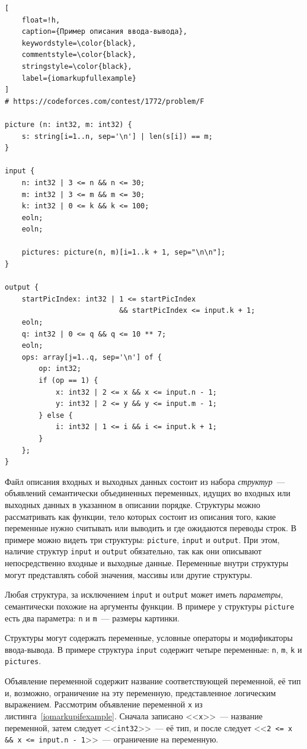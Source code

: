 \documentclass[times,specification,annotation]{style/itmo-student-thesis/itmo-student-thesis}
\begin{document}
\begin{lstlisting}[
    float=!h,
    caption={Пример описания ввода-вывода},
    keywordstyle=\color{black},
    commentstyle=\color{black},
    stringstyle=\color{black},
    label={iomarkupfullexample}
]
# https://codeforces.com/contest/1772/problem/F

picture (n: int32, m: int32) {
    s: string[i=1..n, sep='\n'] | len(s[i]) == m;
}

input {
    n: int32 | 3 <= n && n <= 30;
    m: int32 | 3 <= m && m <= 30;
    k: int32 | 0 <= k && k <= 100;
    eoln;
    eoln;

    pictures: picture(n, m)[i=1..k + 1, sep="\n\n"];
}

output {
    startPicIndex: int32 | 1 <= startPicIndex
                           && startPicIndex <= input.k + 1;
    eoln;
    q: int32 | 0 <= q && q <= 10 ** 7;
    eoln;
    ops: array[j=1..q, sep='\n'] of {
        op: int32;
        if (op == 1) {
            x: int32 | 2 <= x && x <= input.n - 1;
            y: int32 | 2 <= y && y <= input.m - 1;
        } else {
            i: int32 | 1 <= i && i <= input.k + 1;
        }
    };
}

\end{lstlisting}

Файл описания входных и выходных данных состоит из набора \textit{структур}~--- объявлений семантически объединенных переменных, идущих во входных или выходных данных в указанном в описании порядке. Структуры можно рассматривать как функции, тело которых состоит из описания того, какие переменные нужно считывать или выводить и где ожидаются переводы строк. В примере можно видеть три структуры: \texttt{picture}, \texttt{input} и \texttt{output}. При этом, наличие структур \texttt{input} и \texttt{output} обязательно, так как они описывают непосредственно входные и выходные данные. Переменные внутри структуры могут представлять собой значения, массивы или другие структуры.

Любая структура, за исключением \texttt{input} и \texttt{output} может иметь \textit{параметры}, семантически похожие на аргументы функции. В примере у структуры \texttt{picture} есть два параметра: \texttt{n} и \texttt{m}~--- размеры картинки.

Структуры могут содержать переменные, условные операторы и модификаторы ввода-вывода. В примере структура \texttt{input} содержит четыре переменные: \texttt{n}, \texttt{m}, \texttt{k} и \texttt{pictures}.

Объявление переменной содержит название соответствующей переменной, её тип и, возможно, ограничение на эту переменную, представленное логическим выражением. Рассмотрим объявление переменной \texttt{x} из листинга~\ref{iomarkupifexample}. Сначала записано <<\texttt{x}>>~--- название переменной, затем следует <<\texttt{int32}>>~--- её тип, и после следует <<\texttt{2 <= x \&\& x <= input.n - 1}>>~--- ограничение на переменную.
\end{document}

